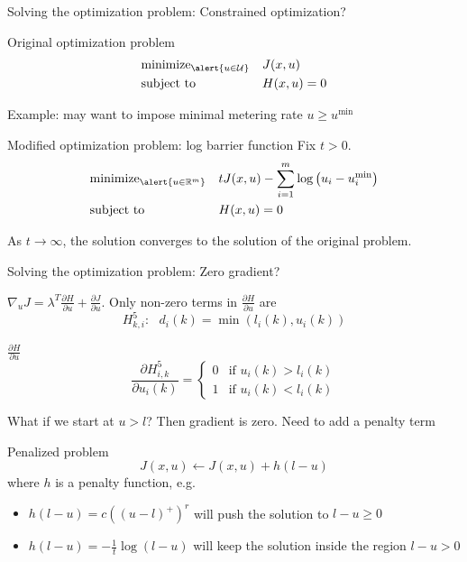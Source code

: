 \documentclass[xcolor=svgnames, english, smaller]{beamer}
\theoremstyle{plain}
\theoremstyle{definition}
\theoremstyle{plain}
\theoremstyle{plain}
\newcommand \Rbb{\mathbb{R}}
\newcommand \Ucal{\mathcal{U}}
\begin{document}
\begin{frame}{Solving the optimization problem: Constrained optimization?}

\begin{block}{Original optimization problem}
\[
\begin{aligned}
&\text{minimize}_{\alert{u \in \Ucal}} && J(x,u) \\
&\text{subject to} &&H(x,u) = 0
\end{aligned}
\]
\end{block}

Example: may want to impose minimal metering rate $u \geq u^{\min}$

\begin{block}{Modified optimization problem: log barrier function}
Fix $t > 0$.
\[
\begin{aligned}
&\text{minimize}_{\alert{u \in \Rbb^m}} && t J(x,u) - \sum_{i = 1}^m \log \left(  u_i - u_i^{\min} \right) \\
&\text{subject to} &&H(x,u) = 0
\end{aligned}
\]
\end{block}

As $t \rightarrow \infty$, the solution converges to the solution of the original problem.



\end{frame}



\begin{frame}{Solving the optimization problem: Zero gradient?}


$\nabla_u J = \lambda^T \frac{\partial H}{\partial u} + \frac{\partial J}{\partial u}$. Only non-zero terms in $\frac{\partial H}{\partial u}$ are
\[
H^5_{k, i}: \ \ \ d_i(k) = \min(l_i(k), u_i(k))
\]

\begin{block}{$\frac{\partial H}{\partial u}$}
\[
\frac{\partial H^5_{i, k}}{\partial u_i(k)} = 
\begin{cases}
0 & \text{if } u_i(k) > l_i(k) \\ 
1 & \text{if } u_i(k) < l_i(k)
\end{cases}
\]
\end{block}

What if we start at $u > l$? Then gradient is zero. Need to add a penalty term

\begin{block}{Penalized problem}
\[
J(x, u) \leftarrow J(x, u) + h(l - u)
\]
where $h$ is a penalty function, e.g.
\begin{itemize}
\item $h(l-u) = c((u-l)^+)^r$ will push the solution to $l - u \geq 0$
\item $h(l-u) = -\frac{1}{t}\log(l-u)$ will keep the solution inside the region $l - u > 0$
\end{itemize}
\end{block}

\end{frame}
\end{document}
